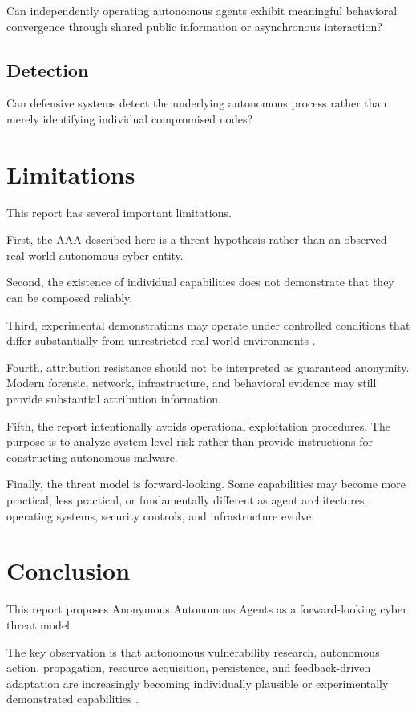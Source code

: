 \documentclass[11pt,a4paper]{article}
\begin{document}
Can independently operating autonomous agents exhibit meaningful behavioral
convergence through shared public information or asynchronous interaction?

\subsection{Detection}

Can defensive systems detect the underlying autonomous process rather than
merely identifying individual compromised nodes?

\section{Limitations}

This report has several important limitations.

First, the AAA described here is a threat hypothesis rather than an observed
real-world autonomous cyber entity.

Second, the existence of individual capabilities does not demonstrate that
they can be composed reliably.

Third, experimental demonstrations may operate under controlled conditions
that differ substantially from unrestricted real-world environments
\cite{R2,R3,R5,R6}.

Fourth, attribution resistance should not be interpreted as guaranteed
anonymity. Modern forensic, network, infrastructure, and behavioral evidence
may still provide substantial attribution information.

Fifth, the report intentionally avoids operational exploitation procedures.
The purpose is to analyze system-level risk rather than provide instructions
for constructing autonomous malware.

Finally, the threat model is forward-looking. Some capabilities may become
more practical, less practical, or fundamentally different as agent
architectures, operating systems, security controls, and infrastructure
evolve.

\section{Conclusion}

This report proposes Anonymous Autonomous Agents as a forward-looking cyber
threat model.

The key observation is that autonomous vulnerability research, autonomous
action, propagation, resource acquisition, persistence, and feedback-driven
adaptation are increasingly becoming individually plausible or experimentally
demonstrated capabilities \cite{R1,R2,R3,R5,R6}.
\end{document}
